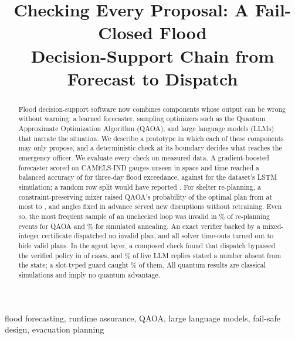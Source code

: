 \documentclass[conference]{IEEEtran}
\begin{document}
\title{Checking Every Proposal: A Fail-Closed Flood\\
Decision-Support Chain from Forecast to Dispatch}

\author{
}

\maketitle

\begin{abstract}
Flood decision-support software now combines components whose output can be wrong without warning: a learned forecaster, sampling optimizers such as the Quantum Approximate Optimization Algorithm (QAOA), and large language models (LLMs) that narrate the situation. We describe a prototype in which each of these components may only propose, and a deterministic check at its boundary decides what reaches the emergency officer. We evaluate every check on measured data. A gradient-boosted forecaster scored on CAMELS-IND gauges unseen in space and time reached a balanced accuracy of \FcXgbBA{} for three-day flood exceedance, against \FcLstmBA{} for the dataset's LSTM simulation; a random row split would have reported \FcLeakRandBA. For shelter re-planning, a constraint-preserving mixer raised QAOA's probability of the optimal plan from at most \QaSeedXMax{} to \QaSeedXYMean, and angles fixed in advance served new disruptions without retraining. Even so, the most frequent sample of an unchecked loop was invalid in \RaTwinRawQ\% of re-planning events for QAOA and \RaTwinRawSA\% for simulated annealing. An exact verifier backed by a mixed-integer certificate dispatched no invalid plan, and all \RaCityTimeout{} solver time-outs turned out to hide valid plans. In the agent layer, a composed check found that dispatch bypassed the verified policy in \AgEtoEViolBefore{} of \AgEtoECases{} cases, and \AgLiveUnsupPct\% of \AgLiveN{} live LLM replies stated a number absent from the state; a slot-typed guard caught \AgLiveTypRec\% of them. All quantum results are classical simulations and imply no quantum advantage.
\end{abstract}

\begin{IEEEkeywords}
flood forecasting, runtime assurance, QAOA, large language models, fail-safe design, evacuation planning
\end{IEEEkeywords}
\end{document}

